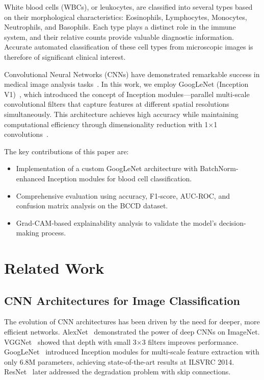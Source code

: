 \documentclass[conference]{IEEEtran}
\begin{document}
White blood cells (WBCs), or leukocytes, are classified into several types based on their morphological characteristics: Eosinophils, Lymphocytes, Monocytes, Neutrophils, and Basophils. Each type plays a distinct role in the immune system, and their relative counts provide valuable diagnostic information. Accurate automated classification of these cell types from microscopic images is therefore of significant clinical interest.

Convolutional Neural Networks (CNNs) have demonstrated remarkable success in medical image analysis tasks~\cite{liang2018cnn}. In this work, we employ GoogLeNet (Inception V1)~\cite{szegedy2015going}, which introduced the concept of Inception modules---parallel multi-scale convolutional filters that capture features at different spatial resolutions simultaneously. This architecture achieves high accuracy while maintaining computational efficiency through dimensionality reduction with 1$\times$1 convolutions~\cite{lin2014network}.

The key contributions of this paper are:
\begin{itemize}
    \item Implementation of a custom GoogLeNet architecture with BatchNorm-enhanced Inception modules for blood cell classification.
    \item Comprehensive evaluation using accuracy, F1-score, AUC-ROC, and confusion matrix analysis on the BCCD dataset.
    \item Grad-CAM-based explainability analysis to validate the model's decision-making process.
\end{itemize}

\section{Related Work}

\subsection{CNN Architectures for Image Classification}

The evolution of CNN architectures has been driven by the need for deeper, more efficient networks. AlexNet~\cite{krizhevsky2012imagenet} demonstrated the power of deep CNNs on ImageNet. VGGNet~\cite{simonyan2015very} showed that depth with small 3$\times$3 filters improves performance. GoogLeNet~\cite{szegedy2015going} introduced Inception modules for multi-scale feature extraction with only 6.8M parameters, achieving state-of-the-art results at ILSVRC 2014. ResNet~\cite{he2016deep} later addressed the degradation problem with skip connections.
\end{document}
